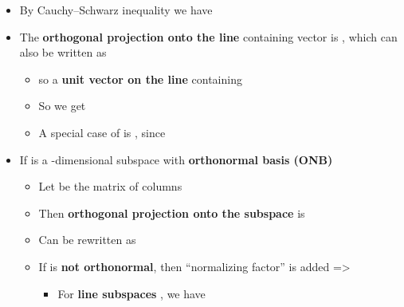 \begin{itemize}

\item
  By
  Cauchy--Schwarz inequality we have 
\item
  The \textbf{orthogonal projection onto the line} containing vector
   is ,
  which can also be written as

  \begin{itemize}
  
  \item
     so  a
    \textbf{unit vector on the line} containing 
  \item
    So we get
  \item
    A special case of  is
    , since
  \end{itemize}
\item
  If  is a -dimensional
  subspace with \textbf{orthonormal basis (ONB)}

  \begin{itemize}
  
  \item
    Let
    be the matrix of columns 
  \item
    Then \textbf{orthogonal projection onto the subspace}  is
  \item
    Can be rewritten as
  \item
    If  is
    \textbf{not orthonormal}, then ``normalizing factor''
     is added =\textgreater{}

    \begin{itemize}
    
    \item
      For \textbf{line subspaces} , we
      have
    \end{itemize}
  \end{itemize}
\end{itemize}

